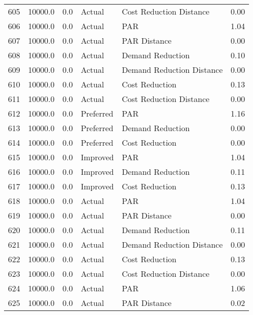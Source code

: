 \begin{longtable}{lrrllr}
605  &      10000.0 &     0.0 &         Actual &    Cost Reduction Distance &   0.00 \\
606  &      10000.0 &     0.0 &         Actual &                        PAR &   1.04 \\
607  &      10000.0 &     0.0 &         Actual &               PAR Distance &   0.00 \\
608  &      10000.0 &     0.0 &         Actual &           Demand Reduction &   0.10 \\
609  &      10000.0 &     0.0 &         Actual &  Demand Reduction Distance &   0.00 \\
610  &      10000.0 &     0.0 &         Actual &             Cost Reduction &   0.13 \\
611  &      10000.0 &     0.0 &         Actual &    Cost Reduction Distance &   0.00 \\
612  &      10000.0 &     0.0 &      Preferred &                        PAR &   1.16 \\
613  &      10000.0 &     0.0 &      Preferred &           Demand Reduction &   0.00 \\
614  &      10000.0 &     0.0 &      Preferred &             Cost Reduction &   0.00 \\
615  &      10000.0 &     0.0 &       Improved &                        PAR &   1.04 \\
616  &      10000.0 &     0.0 &       Improved &           Demand Reduction &   0.11 \\
617  &      10000.0 &     0.0 &       Improved &             Cost Reduction &   0.13 \\
618  &      10000.0 &     0.0 &         Actual &                        PAR &   1.04 \\
619  &      10000.0 &     0.0 &         Actual &               PAR Distance &   0.00 \\
620  &      10000.0 &     0.0 &         Actual &           Demand Reduction &   0.11 \\
621  &      10000.0 &     0.0 &         Actual &  Demand Reduction Distance &   0.00 \\
622  &      10000.0 &     0.0 &         Actual &             Cost Reduction &   0.13 \\
623  &      10000.0 &     0.0 &         Actual &    Cost Reduction Distance &   0.00 \\
624  &      10000.0 &     0.0 &         Actual &                        PAR &   1.06 \\
625  &      10000.0 &     0.0 &         Actual &               PAR Distance &   0.02 \\

\end{longtable}
